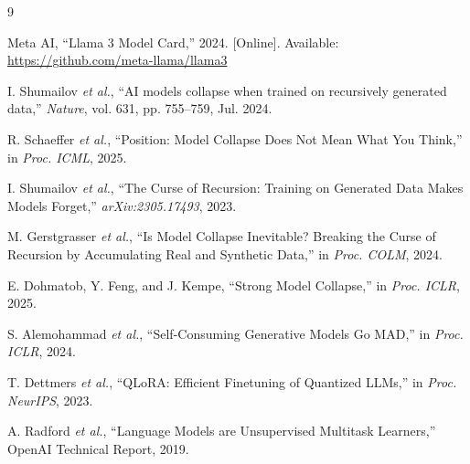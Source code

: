 \documentclass[conference]{IEEEtran}
\begin{document}

\begin{thebibliography}{9}

Meta AI, ``Llama 3 Model Card,'' 2024. [Online]. Available: \url{https://github.com/meta-llama/llama3}

I. Shumailov \textit{et al.}, ``AI models collapse when trained on recursively generated data,'' \textit{Nature}, vol. 631, pp. 755--759, Jul. 2024.

R. Schaeffer \textit{et al.}, ``Position: Model Collapse Does Not Mean What You Think,'' in \textit{Proc. ICML}, 2025.

I. Shumailov \textit{et al.}, ``The Curse of Recursion: Training on Generated Data Makes Models Forget,'' \textit{arXiv:2305.17493}, 2023.

M. Gerstgrasser \textit{et al.}, ``Is Model Collapse Inevitable? Breaking the Curse of Recursion by Accumulating Real and Synthetic Data,'' in \textit{Proc. COLM}, 2024.

E. Dohmatob, Y. Feng, and J. Kempe, ``Strong Model Collapse,'' in \textit{Proc. ICLR}, 2025.

S. Alemohammad \textit{et al.}, ``Self-Consuming Generative Models Go MAD,'' in \textit{Proc. ICLR}, 2024.

T. Dettmers \textit{et al.}, ``QLoRA: Efficient Finetuning of Quantized LLMs,'' in \textit{Proc. NeurIPS}, 2023.

A. Radford \textit{et al.}, ``Language Models are Unsupervised Multitask Learners,'' OpenAI Technical Report, 2019.

\end{thebibliography}
\end{document}
